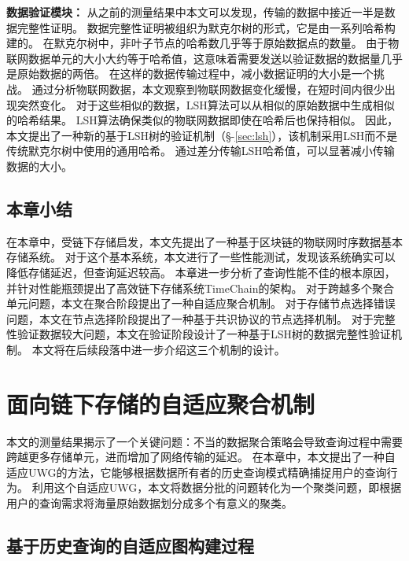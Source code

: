 \textbf{数据验证模块：}
从之前的测量结果中本文可以发现，传输的数据中接近一半是数据完整性证明。
数据完整性证明被组织为默克尔树的形式，它是由一系列哈希构建的。
在默克尔树中，非叶子节点的哈希数几乎等于原始数据点的数量。
由于物联网数据单元的大小大约等于哈希值，这意味着需要发送以验证数据的数据量几乎是原始数据的两倍。
在这样的数据传输过程中，减小数据证明的大小是一个挑战。
通过分析物联网数据，本文观察到物联网数据变化缓慢，在短时间内很少出现突然变化。
对于这些相似的数据，LSH算法可以从相似的原始数据中生成相似的哈希结果。
LSH算法确保类似的物联网数据即使在哈希后也保持相似。
因此，本文提出了一种新的基于LSH树的验证机制（§-\ref{sec:lsh}），该机制采用LSH而不是传统默克尔树中使用的通用哈希。
通过差分传输LSH哈希值，可以显著减小传输数据的大小。

\section{本章小结}
在本章中，受链下存储启发，本文先提出了一种基于区块链的物联网时序数据基本存储系统。
对于这个基本系统，本文进行了一些性能测试，发现该系统确实可以降低存储延迟，但查询延迟较高。
本章进一步分析了查询性能不佳的根本原因，并针对性能瓶颈提出了高效链下存储系统TimeChain的架构。
对于跨越多个聚合单元问题，本文在聚合阶段提出了一种自适应聚合机制。
对于存储节点选择错误问题，本文在节点选择阶段提出了一种基于共识协议的节点选择机制。
对于完整性验证数据较大问题，本文在验证阶段设计了一种基于LSH树的数据完整性验证机制。
本文将在后续段落中进一步介绍这三个机制的设计。

\chapter{面向链下存储的自适应聚合机制}
\label{sec:packaging}
本文的测量结果揭示了一个关键问题：不当的数据聚合策略会导致查询过程中需要跨越更多存储单元，进而增加了网络传输的延迟。
在本章中，本文提出了一种自适应UWG的方法，它能够根据数据所有者的历史查询模式精确捕捉用户的查询行为。
利用这个自适应UWG，本文将数据分批的问题转化为一个聚类问题，即根据用户的查询需求将海量原始数据划分成多个有意义的聚类。

\section{基于历史查询的自适应图构建过程}
\label{sec:UWG}

